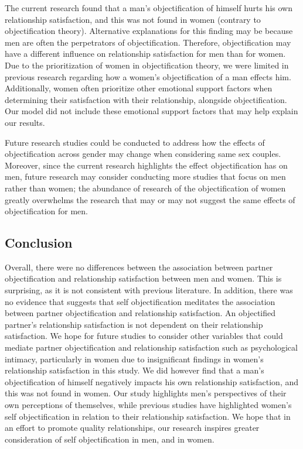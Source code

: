 \documentclass[
  man]{apa6}
\begin{document}
The current research found that a man's objectification of himself hurts his own relationship satisfaction, and this was not found in women (contrary to objectification theory). Alternative explanations for this finding may be because men are often the perpetrators of objectification. Therefore, objectification may have a different influence on relationship satisfaction for men than for women. Due to the prioritization of women in objectification theory, we were limited in previous research regarding how a women's objectification of a man effects him. Additionally, women often prioritize other emotional support factors when determining their satisfaction with their relationship, alongside objectification. Our model did not include these emotional support factors that may help explain our results.

Future research studies could be conducted to address how the effects of objectification across gender may change when considering same sex couples. Moreover, since the current research highlights the effect objectification has on men, future research may consider conducting more studies that focus on men rather than women; the abundance of research of the objectification of women greatly overwhelms the research that may or may not suggest the same effects of objectification for men.

\hypertarget{conclusion}{%
\subsection{Conclusion}\label{conclusion}}

Overall, there were no differences between the association between partner objectification and relationship satisfaction between men and women. This is surprising, as it is not consistent with previous literature. In addition, there was no evidence that suggests that self objectification meditates the association between partner objectification and relationship satisfaction. An objectified partner's relationship satisfaction is not dependent on their relationship satisfaction. We hope for future studies to consider other variables that could mediate partner objectification and relationship satisfaction such as psychological intimacy, particularly in women due to insignificant findings in women's relationship satisfaction in this study. We did however find that a man's objectification of himself negatively impacts his own relationship satisfaction, and this was not found in women. Our study highlights men's perspectives of their own perceptions of themselves, while previous studies have highlighted women's self objectification in relation to their relationship satisfaction. We hope that in an effort to promote quality relationships, our research inspires greater consideration of self objectification in men, and in women.
\end{document}
